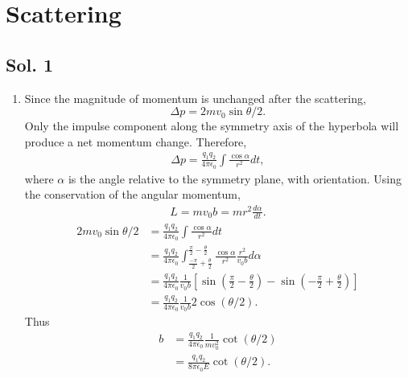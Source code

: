 \section{Scattering}
\subsection*{Sol. 1}
\begin{enumerate}
    \item
          Since the magnitude of momentum is unchanged after the scattering,
          $$
              \Delta p = 2mv_0\sin\theta/2.
          $$
          Only the impulse component along the symmetry axis of the hyperbola will produce a net momentum change. Therefore,
          \begin{align*}
              \Delta p =
              \frac{q_1q_2}{4\pi\epsilon_0}
              \int \frac{\cos\alpha}{r^2}dt,
          \end{align*}
          where $\alpha$ is the angle relative to the symmetry plane, with orientation.
          Using the conservation of the angular momentum,
          \begin{align*}
              L = mv_0 b = mr^2\frac{d\alpha}{dt}.
          \end{align*}
          \begin{align*}
              2mv_0\sin\theta/2 & =
              \frac{q_1q_2}{4\pi\epsilon_0}
              \int \frac{\cos\alpha}{r^2}dt \\
                                & =
              \frac{q_1q_2}{4\pi\epsilon_0}
              \int_{\frac{-\pi}{2}+\frac{\theta}{2}}^{\frac{\pi}{2}-\frac{\theta}{2}} \frac{\cos\alpha}{r^2}\frac{r^2}{v_0 b}d\alpha \\
                                & =
              \frac{q_1q_2}{4\pi\epsilon_0}
              \frac{1}{v_0 b}
              \left[\sin\left(\frac{\pi}{2}-\frac{\theta}{2}\right)
                  -\sin\left(-\frac{\pi}{2}+\frac{\theta}{2}\right)
                  \right] \\
                                & =
              \frac{q_1q_2}{4\pi\epsilon_0}
              \frac{1}{v_0 b}2\cos(\theta/2).
          \end{align*}
          Thus
          \begin{align*}
              b & =\frac{q_1q_2}{4\pi\epsilon_0}
              \frac{1}{mv^2_0}\cot(\theta/2) \\
                & =
              \frac{q_1q_2}{8\pi\epsilon_0E}
              \cot(\theta/2).

\end{align*}
\end{enumerate}
